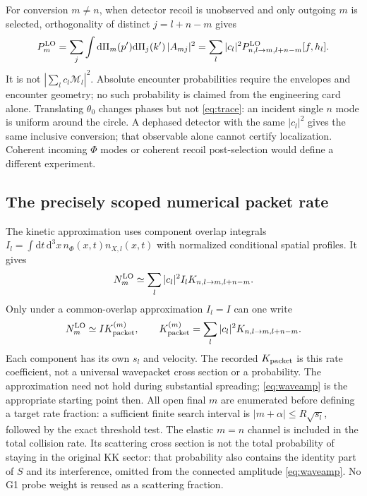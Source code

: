 \documentclass[11pt,a4paper]{article}
\newcommand{\dd}{\mathrm d}
\newcommand{\cM}{\mathcal M}
\begin{document}
For conversion $m\ne n$, when detector recoil is unobserved and only
outgoing $m$ is selected,
orthogonality of distinct $j=l+n-m$ gives
\begin{equation}\label{eq:trace}
 P_m^{\rm LO}=\sum_j\int\dd\Pi_m(p')\dd\Pi_j(k')\,|A_{mj}|^2
 =\sum_l |c_l|^2 P_{n,l\to m,l+n-m}^{\rm LO}[f,h_l].
\end{equation}
It is not $|\sum_l c_l\cM_l|^2$. Absolute encounter probabilities
require the envelopes and encounter geometry; no such probability
is claimed from the engineering card alone.
Translating $\theta_0$ changes phases but not \eqref{eq:trace}:
an incident single $n$ mode is uniform around the circle.
A dephased detector with the same $|c_l|^2$ gives the same inclusive
conversion; that observable alone cannot certify localization.
Coherent incoming $\Phi$ modes or coherent recoil post-selection
would define a different experiment.

\subsection*{The precisely scoped numerical packet rate}
The kinetic approximation uses component overlap integrals
$I_l=\int\dd t\,\dd^3x\,n_\Phi(x,t)n_{X,l}(x,t)$ with
normalized conditional spatial profiles. It gives
\begin{equation}
 N_m^{\rm LO}\simeq\sum_l |c_l|^2 I_l K_{n,l\to m,l+n-m}.
\end{equation}
Only under a common-overlap approximation $I_l=I$ can one write
\begin{equation}
 N_m^{\rm LO}\simeq I K_{\rm packet}^{(m)},\qquad
 K_{\rm packet}^{(m)}=\sum_l |c_l|^2 K_{n,l\to m,l+n-m}.
\end{equation}
Each component has its own $s_l$ and velocity. The recorded
$K_{\rm packet}$ is this rate coefficient, not a universal
wavepacket cross section or a probability. The approximation need
not hold during substantial spreading; \eqref{eq:waveamp} is the
appropriate starting point then.
All open final $m$ are enumerated before defining a target rate
fraction: a sufficient finite search interval is
$|m+\alpha|\leq R\sqrt{s_l}$, followed by the exact threshold test.
The elastic $m=n$ channel is included in the total collision rate.
Its scattering cross section is not the total probability of staying
in the original KK sector: that probability also contains the identity
part of $S$ and its interference, omitted from the connected amplitude
\eqref{eq:waveamp}. No G1 probe weight is reused as a scattering fraction.
\end{document}
